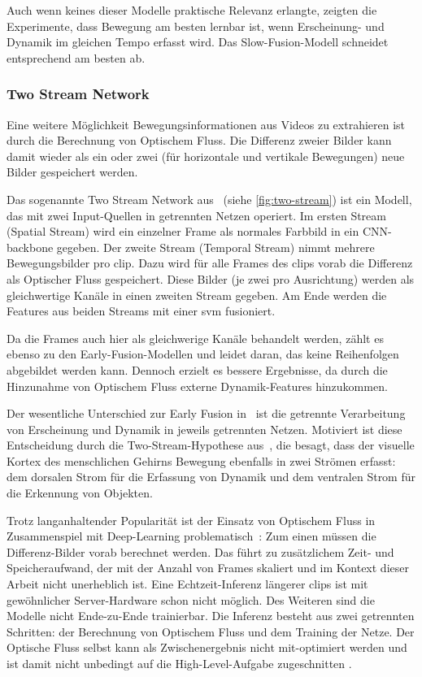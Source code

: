 Auch wenn keines dieser Modelle praktische Relevanz erlangte, zeigten die Experimente, dass Bewegung am besten lernbar ist, wenn Erscheinung- und Dynamik im gleichen Tempo erfasst wird.
Das Slow-Fusion-Modell schneidet entsprechend am besten ab.

\subsubsection{Two Stream Network}

Eine weitere Möglichkeit Bewegungsinformationen aus Videos zu extrahieren ist durch die Berechnung von Optischem Fluss.
Die Differenz zweier Bilder kann damit wieder als ein oder zwei (für horizontale und vertikale Bewegungen) neue Bilder gespeichert werden.

Das sogenannte Two Stream Network aus~\cite{Simonyan14} (siehe \autoref{fig:two-stream}) ist ein Modell, das mit zwei Input-Quellen in getrennten Netzen operiert.
Im ersten Stream (Spatial Stream) wird ein einzelner Frame als normales Farbbild in ein CNN-\gls{backbone} gegeben.
Der zweite Stream (Temporal Stream) nimmt mehrere Bewegungsbilder pro \gls{clip}.
Dazu wird für alle Frames des \glspl{clip} vorab die Differenz als Optischer Fluss gespeichert.
Diese Bilder (je zwei pro Ausrichtung) werden als gleichwertige Kanäle in einen zweiten Stream gegeben.
Am Ende werden die Features aus beiden Streams mit einer \gls{svm} fusioniert.

Da die Frames auch hier als gleichwerige Kanäle behandelt werden, zählt es ebenso zu den Early-Fusion-Modellen und leidet daran, das keine Reihenfolgen abgebildet werden kann.
Dennoch erzielt es bessere Ergebnisse, da durch die Hinzunahme von Optischem Fluss externe Dynamik-Features hinzukommen.

Der wesentliche Unterschied zur Early Fusion in~\cite{Karpathy14} ist die getrennte Verarbeitung von Erscheinung und Dynamik in jeweils getrennten Netzen.
Motiviert ist diese Entscheidung durch die Two-Stream-Hypothese aus~\cite{Goodale92}, die besagt, dass der visuelle Kortex des menschlichen Gehirns Bewegung ebenfalls in zwei Strömen erfasst:
dem dorsalen Strom für die Erfassung von Dynamik und dem ventralen Strom für die Erkennung von Objekten.

Trotz langanhaltender Popularität ist der Einsatz von Optischem Fluss in Zusammenspiel mit Deep-Learning problematisch~\cite{Zhu17}:
Zum einen müssen die Differenz-Bilder vorab berechnet werden.
Das führt zu zusätzlichem Zeit- und Speicheraufwand, der mit der Anzahl von Frames skaliert und im Kontext dieser Arbeit nicht unerheblich ist.
Eine Echtzeit-Inferenz längerer \glspl{clip} ist mit gewöhnlicher Server-Hardware schon nicht möglich.
Des Weiteren sind die Modelle nicht Ende-zu-Ende trainierbar.
Die Inferenz besteht aus zwei getrennten Schritten: der Berechnung von Optischem Fluss und dem Training der Netze.
Der Optische Fluss selbst kann als Zwischenergebnis nicht mit-optimiert werden und ist damit nicht unbedingt auf die High-Level-Aufgabe zugeschnitten \cite{Zhu17}.

